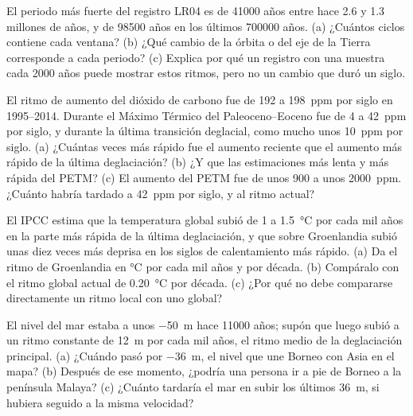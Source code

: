 \begin{exercise}[$\star\star\star$]\label{exo:g12:past-climates:12}
El periodo más fuerte del registro LR04 es de \num{41000} años entre hace 2.6
y 1.3 millones de años, y de \num{98500} años en los últimos \num{700000}
años. (a) ¿Cuántos ciclos contiene cada ventana? (b) ¿Qué cambio de la
órbita o del eje de la Tierra corresponde a cada periodo? (c) Explica por qué un registro con
una muestra cada \num{2000} años puede mostrar estos ritmos, pero no un cambio
que duró un siglo.
\end{exercise}

\begin{exercise}[$\star\star\star$]\label{exo:g12:past-climates:13}
El ritmo de aumento del dióxido de carbono fue de 192 a \qty{198}{ppm} por siglo en
1995--2014. Durante el Máximo Térmico del Paleoceno--Eoceno fue de 4 a
\qty{42}{ppm} por siglo, y durante la última transición deglacial, como mucho
unos \qty{10}{ppm} por siglo. (a) ¿Cuántas veces más rápido fue el aumento reciente
que el aumento más rápido de la última deglaciación? (b) ¿Y que las estimaciones más lenta y
más rápida del PETM? (c) El aumento del PETM fue de unos 900 a unos
\qty{2000}{ppm}. ¿Cuánto habría tardado a \qty{42}{ppm} por siglo,
y al ritmo actual?
\end{exercise}

\begin{exercise}[$\star\star\star$]\label{exo:g12:past-climates:14}
El IPCC estima que la temperatura global subió de 1 a
\qty{1.5}{\degreeCelsius} por cada mil años en la parte más rápida de la última
deglaciación, y que sobre Groenlandia subió unas diez veces más deprisa en los
siglos de calentamiento más rápido. (a) Da el ritmo de Groenlandia en
\unit{\degreeCelsius} por cada mil años y por década. (b) Compáralo con el
ritmo global actual de \qty{0.20}{\degreeCelsius} por década. (c) ¿Por qué no debe
compararse directamente un ritmo local con uno global?
\end{exercise}

\begin{exercise}[$\star\star\star$]\label{exo:g12:past-climates:15}
El nivel del mar estaba a unos \qty{-50}{m} hace \num{11000} años; supón que luego
subió a un ritmo constante de \qty{12}{m} por cada mil años, el ritmo medio de la deglaciación
principal. (a) ¿Cuándo pasó por \qty{-36}{m}, el nivel que une Borneo
con Asia en el mapa? (b) Después de ese momento, ¿podría una persona ir a pie de Borneo a
la península Malaya? (c) ¿Cuánto tardaría el mar en subir los últimos
\qty{36}{m}, si hubiera seguido a la misma velocidad?
\end{exercise}

